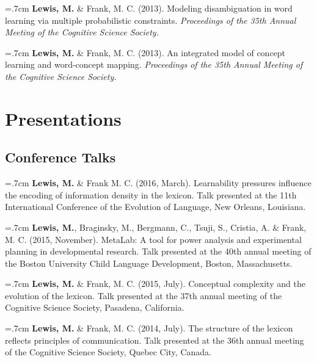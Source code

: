 \documentclass[letterpaper]{article}
\begin{document}
  
 \hangindent=.7cm {\bf Lewis, M.} \& Frank, M. C. (2013). Modeling disambiguation in word learning via multiple probabilistic constraints. { \it Proceedings of the 35th Annual Meeting of the Cognitive Science Society.}

 \hangindent=.7cm {\bf Lewis, M.} \& Frank, M. C. (2013). An integrated model of concept learning and word-concept mapping.{ \it Proceedings of the 35th Annual Meeting of the Cognitive Science Society.}
 
 \singlespacing
 
\section*{Presentations}
\onehalfspacing

\subsection*{Conference Talks}

  \hangindent=.7cm {\bf Lewis, M.} \& Frank M. C. (2016, March). Learnability pressures influence the encoding of information density in the lexicon. Talk presented at the 11th International Conference of the Evolution of Language, New Orleans, Louisiana.

\hangindent=.7cm {\bf Lewis, M.},  Braginsky,  M.,  Bergmann, C., Tsuji, S., Cristia, A. \& Frank, M. C. (2015, November). MetaLab: A tool for power analysis and experimental planning in developmental research. Talk presented at the 40th annual meeting of the Boston University Child Language Development, Boston, Massachusetts.

\hangindent=.7cm {\bf Lewis, M.} \& Frank, M. C. (2015, July). Conceptual complexity and the evolution of the lexicon. Talk presented at the 37th annual meeting of the Cognitive Science Society, Pasadena, California.


\hangindent=.7cm {\bf Lewis, M.} \& Frank, M. C. (2014, July). The structure of the lexicon reflects  principles of communication. Talk presented at the 36th annual meeting of the Cognitive Science Society, Quebec City, Canada.
\end{document}
